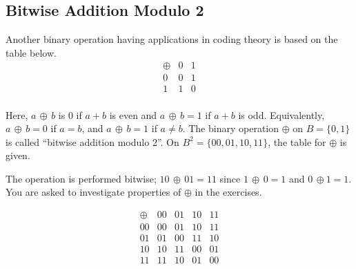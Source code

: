 \documentclass[12pt]{book}
\theoremstyle{definition}
\begin{document}
\subsection{Bitwise Addition Modulo 2}

Another binary operation having applications in coding theory is based on the table below.
$$\begin{array}{c|cc}
\oplus & 0 & 1\\
\hline
0 & 0 & 1\\
1 & 1 & 0\\
\end{array}$$
\rule{0in}{.1in}
Here, $a\,\oplus\,b$ is 0 if $a+b$ is even and $a\,\oplus\,b=1$ if $a+b$ is odd.  Equivalently, $a\,\oplus\,b=0$ if $a=b$, and $a\,\oplus\,b=1$ if $a\neq b$.  The binary operation $\oplus$ on $B=\{0,1\}$ is called ``bitwise addition modulo 2''.  On $B^2=\{00,01,10,11\}$, the table for $\oplus$ is given. \\[.1in]
\begin{minipage}{3.5 in}
The operation is performed bitwise; $10\,\oplus\,01=11$ since $1\,\oplus\,0=1$ and $0\,\oplus 1 =1$.  You are asked to investigate properties of $\oplus$ in the exercises.
\end{minipage}
\begin{minipage}{3.5in}
$$\begin{array}{c|cccc}
\oplus& 00 & 01 & 10 & 11\\
\hline
00 & 00 & 01 & 10 & 11\\
01 & 01 & 00 & 11 & 10\\
10 & 10 & 11 & 00 & 01\\
11 & 11 & 10 & 01 & 00
\end{array}$$
\end{minipage}\\[.2in]
\end{document}
